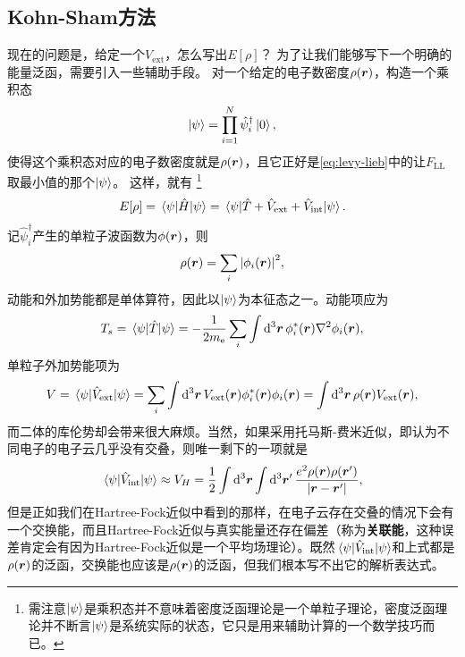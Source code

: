 \documentclass[hyperref, UTF8, a4paper]{ctexart}
\begin{document}
\subsection{Kohn-Sham方法}

现在的问题是，给定一个$V_\text{ext}$，怎么写出$E[\rho]$？
为了让我们能够写下一个明确的能量泛函，需要引入一些辅助手段。
对一个给定的电子数密度$\rho(\vb*{r})$，构造一个乘积态
\begin{equation}
    \ket{\psi} = \prod_{i=1}^N \hat{\psi}^\dagger_i \ket{0},
\end{equation}
使得这个乘积态对应的电子数密度就是$\rho(\vb*{r})$，且它正好是\eqref{eq:levy-lieb}中的让$F_\text{LL}$取最小值的那个$\ket{\psi}$。
这样，就有%
\footnote{需注意$\ket{\psi}$是乘积态并不意味着密度泛函理论是一个单粒子理论，密度泛函理论并不断言$\ket{\psi}$是系统实际的状态，它只是用来辅助计算的一个数学技巧而已。}%
\begin{equation}
    E[\rho] = \mel{\psi}{\hat{H}}{\psi} = \mel{\psi}{\hat{T} + \hat{V}_\text{ext} + \hat{V}_\text{int}}{\psi}.
\end{equation}
记$\hat{\psi}_i^\dagger$产生的单粒子波函数为$\phi(\vb*{r})$，则
\begin{equation}
    \rho(\vb*{r}) = \sum_i \abs{\phi_i(\vb*{r})}^2,
    \label{eq:kohn-sham-density}
\end{equation}
动能和外加势能都是单体算符，因此以$\ket{\psi}$为本征态之一。动能项应为
\begin{equation}
    T_s = \mel{\psi}{\hat{T}}{\psi} = - \frac{1}{2m_\text{e}} \sum_i \int \dd[3]{\vb*{r}} \phi_i^*(\vb*{r}) \laplacian \phi_i(\vb*{r}),
\end{equation}
单粒子外加势能项为
\begin{equation}
    V = \mel{\psi}{\hat{V}_\text{ext}}{\psi} = \sum_i \int \dd[3]{\vb*{r}} V_{\text{ext}}(\vb*{r}) \phi_i^*(\vb*{r}) \phi_i(\vb*{r}) = \int \dd[3]{\vb*{r}} \rho(\vb*{r}) V_\text{ext}(\vb*{r}),
\end{equation}
而二体的库伦势却会带来很大麻烦。当然，如果采用托马斯-费米近似，即认为不同电子的电子云几乎没有交叠，则唯一剩下的一项就是
\[
    \mel{\psi}{\hat{V}_\text{int}}{\psi} \approx V_H = \frac{1}{2} \int \dd[3]{\vb*{r}} \int \dd[3]{\vb*{r}'} \frac{e^2 \rho(\vb*{r}) \rho(\vb*{r}')}{\abs{\vb*{r} - \vb*{r}'}},
\]
但是正如我们在Hartree-Fock近似中看到的那样，在电子云存在交叠的情况下会有一个交换能，而且Hartree-Fock近似与真实能量还存在偏差（称为\textbf{关联能}，这种误差肯定会有因为Hartree-Fock近似是一个平均场理论）。既然$\mel{\psi}{\hat{V}_\text{int}}{\psi}$和上式都是$\rho(\vb*{r})$的泛函，交换能也应该是$\rho(\vb*{r})$的泛函，但我们根本写不出它的解析表达式。
\end{document}
